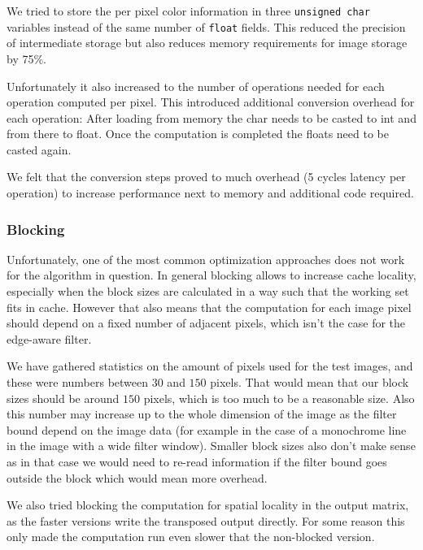 We tried to store the per pixel color information in three \texttt{unsigned char} variables instead of the same number of \texttt{float} fields. This reduced the precision of intermediate storage but also reduces memory requirements for image storage by 75\%.
 
Unfortunately it also increased to the number of operations needed for each operation computed per pixel.  
This introduced additional conversion overhead for each operation: After loading from memory the char needs to be casted to int and from there to float. Once the computation is completed the floats need to be casted again. 

We felt that the conversion steps proved to much overhead (5 cycles latency per operation) to increase performance next to memory and additional code required.

\subsubsection{Blocking}

Unfortunately, one of the most common optimization approaches does not work for the algorithm in question. In general blocking allows to increase cache locality, especially when the block sizes are calculated in a way such that the working set fits in cache. However that also means that the computation for each image pixel should depend on a fixed number of adjacent pixels, which isn't the case for the edge-aware filter.

We have gathered statistics on the amount of pixels used for the test images, and these were numbers between $30$ and $150$ pixels. That would mean that our block sizes should be around $150$ pixels, which is too much to be a reasonable size. Also this number may increase up to the whole dimension of the image as the filter bound depend on the image data (for example in the case of a monochrome line in the image with a wide filter window). Smaller block sizes also don't make sense as in that case we would need to re-read information if the filter bound goes outside the block which would mean more overhead. 

We also tried blocking the computation for spatial locality in the output matrix, as the faster versions write the transposed output directly. For some reason this only made the computation run even slower that the non-blocked version.

